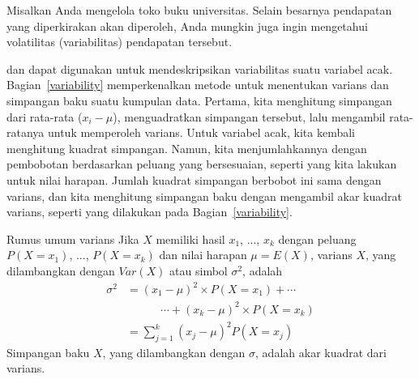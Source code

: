 Misalkan Anda mengelola toko buku universitas. Selain besarnya pendapatan yang diperkirakan akan diperoleh, Anda mungkin juga ingin mengetahui volatilitas (variabilitas) pendapatan tersebut. 

 dan  dapat digunakan untuk mendeskripsikan variabilitas suatu variabel acak. Bagian~\ref{variability}
memperkenalkan metode untuk menentukan varians dan simpangan baku suatu kumpulan data. Pertama, kita menghitung simpangan dari rata-rata ($x_i - \mu$), menguadratkan simpangan tersebut, lalu mengambil rata-ratanya untuk memperoleh varians. Untuk variabel acak, kita kembali menghitung kuadrat simpangan. Namun, kita menjumlahkannya dengan pembobotan berdasarkan peluang yang bersesuaian, seperti yang kita lakukan untuk nilai harapan. Jumlah kuadrat simpangan berbobot ini sama dengan varians, dan kita menghitung simpangan baku dengan mengambil akar kuadrat varians, seperti yang dilakukan pada Bagian~\ref{variability}.

\begin{onebox}{Rumus umum varians}
Jika $X$ memiliki hasil $x_1$, ..., $x_k$ dengan peluang $P(X=x_1)$, ..., $P(X=x_k)$ dan nilai harapan $\mu=E(X)$, varians $X$, yang dilambangkan dengan $Var(X)$ atau simbol $\sigma^2$, adalah
\begin{align*}
\sigma^2 &= (x_1-\mu)^2\times P(X=x_1) + \cdots \\
	& \qquad\quad\cdots+ (x_k-\mu)^2\times P(X=x_k) \\
	&= \sum_{j=1}^{k} (x_j - \mu)^2 P(X=x_j)
\end{align*}
Simpangan baku $X$, yang dilambangkan dengan
$\sigma$,
adalah akar kuadrat dari varians.
\end{onebox}

